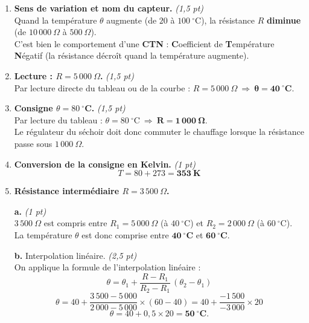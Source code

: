 \documentclass[a4paper,11pt]{article}
\begin{document}
\begin{enumerate}[label=\textbf{\arabic*.},leftmargin=*,itemsep=4pt]

\item \textbf{Sens de variation et nom du capteur.} \hfill\textit{\small(1,5 pt)}\\
Quand la température $\theta$ augmente (de $20$ à $100\ ^\circ$C), la résistance $R$ \textbf{diminue} (de $10\,000\ \Omega$ à $500\ \Omega$). \\
C'est bien le comportement d'une \textbf{CTN} : \textbf{C}oefficient de \textbf{T}empérature \textbf{N}égatif (la résistance décroît quand la température augmente).

\item \textbf{Lecture : $R = 5\,000\ \Omega$.} \hfill\textit{\small(1,5 pt)}\\
Par lecture directe du tableau ou de la courbe : $R = 5\,000\ \Omega \ \Rightarrow\ \mathbf{\theta = 40\ ^\circ\text{C}}$.

\item \textbf{Consigne $\theta = 80\ ^\circ$C.} \hfill\textit{\small(1,5 pt)}\\
Par lecture du tableau : $\theta = 80\ ^\circ\text{C}\ \Rightarrow\ \mathbf{R = 1\,000\ \Omega}$.\\
Le régulateur du séchoir doit donc commuter le chauffage lorsque la résistance passe sous $1\,000\ \Omega$.

\item \textbf{Conversion de la consigne en Kelvin.} \hfill\textit{\small(1 pt)}
\[ T = 80 + 273 = \mathbf{353\ \text{K}} \]

\item \textbf{Résistance intermédiaire $R = 3\,500\ \Omega$.}

\textbf{a.} \hfill\textit{\small(1 pt)}\\
$3\,500\ \Omega$ est compris entre $R_1 = 5\,000\ \Omega$ (à $40\ ^\circ$C) et $R_2 = 2\,000\ \Omega$ (à $60\ ^\circ$C). \\
La température $\theta$ est donc comprise entre $\mathbf{40\ ^\circ\text{C}}$ et $\mathbf{60\ ^\circ\text{C}}$.

\textbf{b.} Interpolation linéaire. \hfill\textit{\small(2,5 pt)}\\
On applique la formule de l'interpolation linéaire :
\[ \theta = \theta_1 + \frac{R - R_1}{R_2 - R_1}\,(\theta_2 - \theta_1) \]
\[ \theta = 40 + \frac{3\,500 - 5\,000}{2\,000 - 5\,000}\times(60 - 40)
          = 40 + \frac{-1\,500}{-3\,000}\times 20 \]
\[ \theta = 40 + 0{,}5 \times 20 = \mathbf{50\ ^\circ\text{C}}. \]

\end{enumerate}
\end{document}
